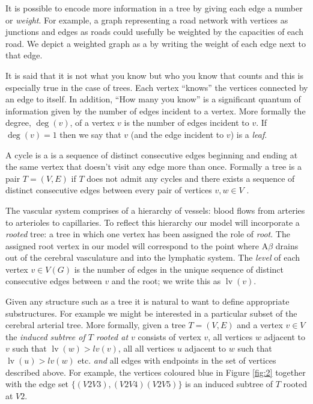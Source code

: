 \documentclass[10pt]{amsart} %
\theoremstyle{definition}
\newtheorem{ex}[thm]{Example}
\DeclareMathOperator{\lv}{lv}
\begin{document}
It is possible to encode more information in a tree by giving each edge a number or \emph{weight}.  For example, a graph 
representing a road network with vertices as junctions and edges as roads could usefully be weighted by the capacities of 
each road.  We depict a weighted graph as a by writing the weight of each edge next to that edge.  



It is said that it is not what you know but who you know that counts and this is especially true in the case of trees. Each 
vertex ``knows'' the vertices connected by an edge to itself. In addition, ``How many you know'' is a significant quantum of 
information given by the number of 
edges incident to a vertex. More formally the degree, $\deg(v)$, of a vertex $v$ is the number of edges incident to $v$.  If 
$\deg(v) = 1$ then we say that $v$ (and the edge incident to $v$) is a \emph{leaf}.       

A cycle is a is a sequence of distinct consecutive edges beginning and ending at the same vertex that doesn't visit any edge 
more than once. Formally a tree is a pair $T = (V,E)$ if $T$ does not admit any cycles and
there exists a sequence of distinct consecutive edges between every pair of vertices $v,w \in V$ \cite{bela}.  

The vascular system comprises of a hierarchy of vessels: blood flows from arteries to arterioles to capillaries.  
To reflect this hierarchy our model will incorporate a \emph{rooted} tree: a tree in which one vertex has been assigned the
role of \emph{root}.  The assigned root vertex in our model will correspond to the point where A$\beta$ drains out of the
cerebral vasculature and into the lymphatic system. The \emph{level} of each vertex $v \in V(G)$ is the number of edges in the
unique sequence of distinct consecutive edges between $v$ and the root; we write this as $\lv(v)$.

Given any structure such as a tree it is natural to want to define appropriate substructures.  For example we might be 
interested in  a particular subset of the cerebral arterial tree. More formally, given a tree $T = (V,E)$ and a vertex 
$v \in V$ the \emph{induced subtree of $T$ rooted at $v$} consists of vertex $v$, all vertices $w$ adjacent to $v$ such 
that $\lv(w) > lv(v)$, all all vertices $u$ adjacent to $w$ such that $\lv(u) > lv(w)$ etc. \emph{and} all edges with 
endpoints in the set of vertices described above.  For example, the vertices coloured blue in Figure \ref{fig:2} together with 
the edge set $\{(V2V3),(V2V4)(V2V5)\}$ is an induced subtree of $T$ rooted at $V2$.  
 
\end{document}

